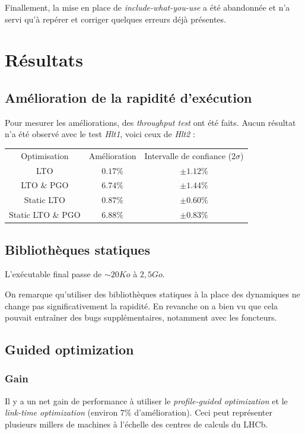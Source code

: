 \documentclass[a4paper]{report}
\begin{document}
        Finallement, la mise en place de \emph{include-what-you-use} a été abandonnée et n'a servi qu'à repérer et corriger quelques erreurs déjà présentes.

\chapter{Résultats}

    \section{Amélioration de la rapidité d'exécution}
        Pour mesurer les améliorations, des \emph{throughput test} ont été faits.
        Aucun résultat n'a été observé avec le test \emph{Hlt1}, voici ceux de \emph{Hlt2} :

        \begin{center}
            \begin{tabular}{ c c c }
                Optimisation & Amélioration & Intervalle de confiance ($2\sigma$) \\
                LTO & $0.17\%$ & $\pm 1.12\%$ \\
                LTO \& PGO & $6.74\%$ & $\pm 1.44\%$ \\
                Static LTO & $0.87\%$ & $\pm 0.60\%$ \\
                Static LTO \& PGO & $6.88\%$ & $\pm 0.83\%$
            \end{tabular}
        \end{center}

    \section{Bibliothèques statiques}
        L'exécutable final passe de $\sim 20 Ko$ à $2,5 Go$.

        On remarque qu'utiliser des bibliothèques statiques à la place des dynamiques ne change pas significativement la rapidité.
        En revanche on a bien vu que cela pouvait entraîner des bugs supplémentaires, notamment avec les foncteurs.

    \section{Guided optimization}
        \subsection{Gain}
            Il y a un net gain de performance à utiliser le \emph{profile-guided optimization} et le \emph{link-time optimization} (environ $7\%$ d'amélioration).
            Ceci peut représenter plusieurs millers de machines à l'échelle des centres de calculs du LHCb.
\end{document}
